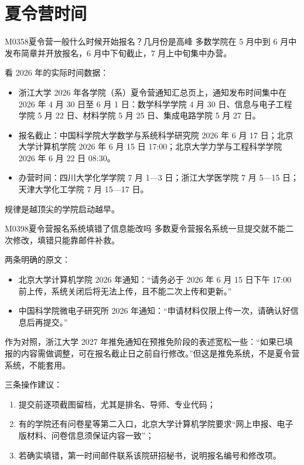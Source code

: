 \section{夏令营时间}
\begin{qa}{M0358}{夏令营一般什么时候开始报名？几月份是高峰}
多数学院在 5 月中到 6 月中发布简章并开放报名，6 月中下旬截止，7 月上中旬集中办营。

看 2026 年的实际时间数据：
\begin{itemize}
  \item 浙江大学 2026 年各学院（系）夏令营通知汇总页上，通知发布时间集中在 2026 年 4 月 30 日至 6 月 1 日：数学科学学院 4 月 30 日、信息与电子工程学院 5 月 22 日、材料学院 5 月 25 日、集成电路学院 5 月 27 日。
  \item 报名截止：中国科学院大学数学与系统科学研究院 2026 年 6 月 17 日；北京大学计算机学院 2026 年 6 月 15 日 17:00；北京大学力学与工程科学学院 2026 年 6 月 22 日 08:30。
  \item 办营时间：四川大学化学学院 7 月 1—3 日；浙江大学医学院 7 月 5—15 日；天津大学化工学院 7 月 15—17 日。
\end{itemize}

规律是越顶尖的学院启动越早。
\end{qa}

\begin{qa}{M0398}{夏令营报名系统填错了信息能改吗}
多数夏令营报名系统一旦提交就不能二次修改，填错只能靠邮件补救。

两条明确的原文：
\begin{itemize}
  \item 北京大学计算机学院 2026 年通知：“请务必于 2026 年 6 月 15 日下午 17:00 前上传，系统关闭后将无法上传，且不能二次上传和更新。”
  \item 中国科学院微电子研究所 2026 年通知：“申请材料仅限上传一次，请确认好信息后再提交。”
\end{itemize}

作为对照，浙江大学 2027 年推免通知在预推免阶段的表述宽松一些：“如果已填报的内容需做调整，可在报名截止日之前自行修改。”但这是推免系统，不是夏令营系统，不能套用。

三条操作建议：
\begin{enumerate}
  \item 提交前逐项截图留档，尤其是排名、导师、专业代码；
  \item 有的学院还有问卷星等第二入口，北京大学计算机学院要求“网上申报、电子版材料、问卷信息须保证内容一致”；
  \item 若确实填错，第一时间邮件联系该院研招秘书，说明报名编号和修改项。
\end{enumerate}
\end{qa}

